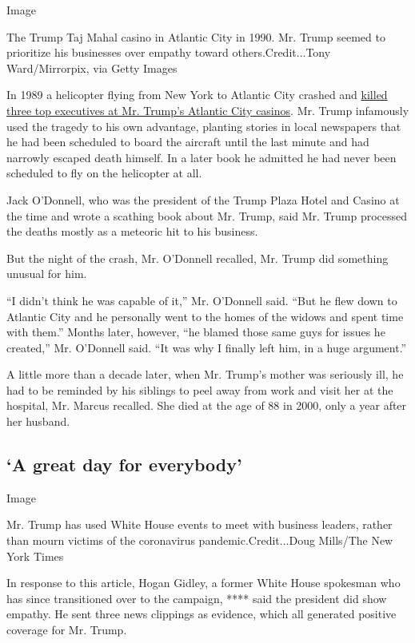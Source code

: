 Image

The Trump Taj Mahal casino in Atlantic City in 1990. Mr. Trump seemed to
prioritize his businesses over empathy toward others.Credit...Tony
Ward/Mirrorpix, via Getty Images

In 1989 a helicopter flying from New York to Atlantic City crashed and
\href{https://www.nytimes.com/1989/10/11/nyregion/copter-crash-kills-3-aides-of-trump.html}{killed
three top executives at Mr. Trump's Atlantic City casinos}. Mr. Trump
infamously used the tragedy to his own advantage, planting stories in
local newspapers that he had been scheduled to board the aircraft until
the last minute and had narrowly escaped death himself. In a later book
he admitted he had never been scheduled to fly on the helicopter at all.

Jack O'Donnell, who was the president of the Trump Plaza Hotel and
Casino at the time and wrote a scathing book about Mr. Trump, said Mr.
Trump processed the deaths mostly as a meteoric hit to his business.

But the night of the crash, Mr. O'Donnell recalled, Mr. Trump did
something unusual for him.

``I didn't think he was capable of it,'' Mr. O'Donnell said. ``But he
flew down to Atlantic City and he personally went to the homes of the
widows and spent time with them.'' Months later, however, ``he blamed
those same guys for issues he created,'' Mr. O'Donnell said. ``It was
why I finally left him, in a huge argument.''

A little more than a decade later, when Mr. Trump's mother was seriously
ill, he had to be reminded by his siblings to peel away from work and
visit her at the hospital, Mr. Marcus recalled. She died at the age of
88 in 2000, only a year after her husband.

\hypertarget{a-great-day-for-everybody}{%
\subsection{`A great day for
everybody'}\label{a-great-day-for-everybody}}

Image

Mr. Trump has used White House events to meet with business leaders,
rather than mourn victims of the coronavirus pandemic.Credit...Doug
Mills/The New York Times

In response to this article, Hogan Gidley, a former White House
spokesman who has since transitioned over to the campaign, **** said the
president did show empathy. He sent three news clippings as evidence,
which all generated positive coverage for Mr. Trump.

